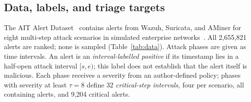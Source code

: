 \documentclass[pdflatex,sn-basic,Numbered]{sn-jnl}
\newcommand{\NAlerts}{2,655,821}
\newcommand{\NCriticalAlerts}{9,204}
\begin{document}
\subsection{Data, labels, and triage targets}

The AIT Alert Dataset~\citep{AITAlertDataset2023,Landauer2024AITADS} contains alerts from Wazuh, Suricata, and AMiner for eight multi-step attack scenarios in simulated enterprise networks~\citep{Landauer2023MaintainableLogs}. All \NAlerts{} alerts are ranked; none is sampled (Table~\ref{tab:data}). Attack phases are given as time intervals. An alert is an \emph{interval-labelled positive} if its timestamp lies in a half-open attack interval $[s,e)$; this label does not establish that the alert itself is malicious. Each phase receives a severity from an author-defined policy; phases with severity at least $\tau=8$ define 32 \emph{critical-step intervals}, four per scenario, all containing alerts, and \NCriticalAlerts{} critical alerts.

\begin{tableorg}[t]
\centering
\caption{Held-out scenarios. Mapped: share of alerts whose native identifier is mapped to an attack phase by the outer training scenarios (label-free for the held-out scenario). Unseen-identifier alerts: alerts whose (detector, native key) never occurs in the training scenarios.}
\label{tab:data}
\end{tableorg}
\end{document}
